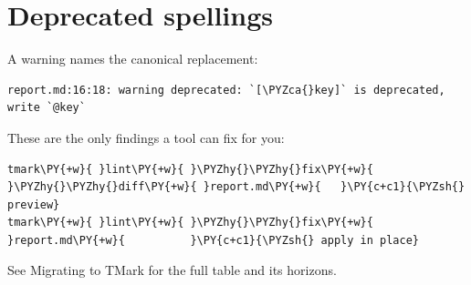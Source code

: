 \documentclass[a4paper,twoside]{article}
\begin{document}
\section{Deprecated spellings}
A  warning names the canonical replacement:
\begin{tscode}[lang=text, engine=pygments]
\begin{Verbatim}[commandchars=\\\{\},breaklines, breakanywhere, commandchars=\\\{\}]
report.md:16:18: warning deprecated: `[\PYZca{}key]` is deprecated, write `@key`
\end{Verbatim}
\end{tscode}
These are the only findings a tool can fix for you:
\begin{tscode}[lang=sh, engine=pygments]
\begin{Verbatim}[commandchars=\\\{\},breaklines, breakanywhere, commandchars=\\\{\}]
tmark\PY{+w}{ }lint\PY{+w}{ }\PYZhy{}\PYZhy{}fix\PY{+w}{ }\PYZhy{}\PYZhy{}diff\PY{+w}{ }report.md\PY{+w}{   }\PY{c+c1}{\PYZsh{} preview}
tmark\PY{+w}{ }lint\PY{+w}{ }\PYZhy{}\PYZhy{}fix\PY{+w}{ }report.md\PY{+w}{          }\PY{c+c1}{\PYZsh{} apply in place}
\end{Verbatim}
\end{tscode}
See Migrating to TMark for the full table and its horizons.
\end{document}
